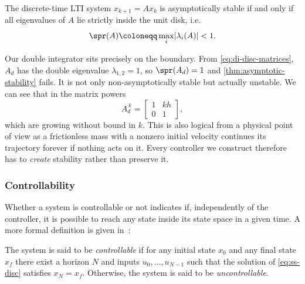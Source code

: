 \begin{theorem}
\label{thm:asymptotic-stability}
The discrete-time LTI system $x_{k+1} = A x_k$ is asymptotically stable if and
only if all eigenvalues of $A$ lie strictly inside the unit disk, i.e.
\begin{equation*}
    \spr(A) \coloneqq \max_{i} \lvert \lambda_i(A) \rvert < 1 .
\end{equation*}
\end{theorem}

Our double integrator sits precisely on the boundary. From
\eqref{eq:di-disc-matrices}, $A_d$ has the double eigenvalue $\lambda_{1,2} = 1$,
so $\spr(A_d) = 1$ and \cref{thm:asymptotic-stability} fails. It is not only
non-asymptotically stable but actually unstable. We can see that in the matrix
powers
\begin{equation}
    \label{eq:di-powers}
    A_d^{\,k} = \begin{bmatrix} 1 & k h \\ 0 & 1 \end{bmatrix},
\end{equation}
which are growing without bound in $k$. This is also logical from a physical
point of view as a frictionless mass with a nonzero initial velocity continues 
its trajectory forever if nothing acts on it. 
Every controller we construct therefore has to \emph{create} stability rather than preserve it.

\subsubsection{Controllability}
\label{subsubsec:controllability}

Whether a system is controllable or not indicates if, independently of the
controller, it is possible to reach any state inside its state space in a given
time. A more formal definition is given in~:

\begin{definition}[Controllability]
\label{def:controllability}
The system is said to be \emph{controllable} if for any initial state
$x_0$ and any final state $x_f$ there exist a horizon $N$ and inputs
$u_0, \dots, u_{N-1}$ such that the solution of \eqref{eq:ss-disc} satisfies
$x_N = x_f$. Otherwise, the system is said to be \emph{uncontrollable}.
\end{definition}

